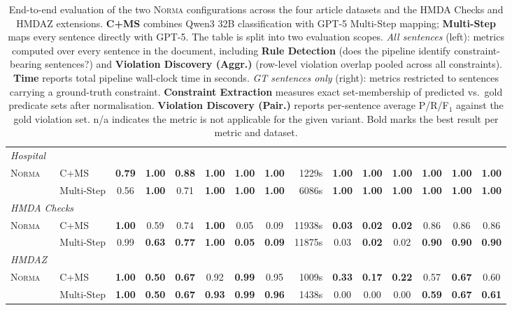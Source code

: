 \begin{table}[t]
\begin{tabular}{llcccccc@{\hspace{0.8em}}r@{\hspace{1.2em}}cccccc}
    \midrule
    \multicolumn{15}{l}{\textit{Hospital}} \\
    \multirow{2}{*}{\textsc{Norma}} & ~~C+MS & \textbf{0.79} & \textbf{1.00} & \textbf{0.88} & \textbf{1.00} & \textbf{1.00} & \textbf{1.00} & 1229s & \textbf{1.00} & \textbf{1.00} & \textbf{1.00} & \textbf{1.00} & \textbf{1.00} & \textbf{1.00} \\
     & ~~Multi-Step & 0.56 & \textbf{1.00} & 0.71 & \textbf{1.00} & \textbf{1.00} & \textbf{1.00} & 6086s & \textbf{1.00} & \textbf{1.00} & \textbf{1.00} & \textbf{1.00} & \textbf{1.00} & \textbf{1.00} \\
    \midrule
    \multicolumn{15}{l}{\textit{HMDA Checks}} \\
    \multirow{2}{*}{\textsc{Norma}} & ~~C+MS & \textbf{1.00} & 0.59 & 0.74 & \textbf{1.00} & 0.05 & 0.09 & 11938s & \textbf{0.03} & \textbf{0.02} & \textbf{0.02} & 0.86 & 0.86 & 0.86 \\
     & ~~Multi-Step & 0.99 & \textbf{0.63} & \textbf{0.77} & \textbf{1.00} & \textbf{0.05} & \textbf{0.09} & 11875s & 0.03 & \textbf{0.02} & 0.02 & \textbf{0.90} & \textbf{0.90} & \textbf{0.90} \\
    \midrule
    \multicolumn{15}{l}{\textit{HMDAZ}} \\
    \multirow{2}{*}{\textsc{Norma}} & ~~C+MS & \textbf{1.00} & \textbf{0.50} & \textbf{0.67} & 0.92 & \textbf{0.99} & 0.95 & 1009s & \textbf{0.33} & \textbf{0.17} & \textbf{0.22} & 0.57 & \textbf{0.67} & 0.60 \\
     & ~~Multi-Step & \textbf{1.00} & \textbf{0.50} & \textbf{0.67} & \textbf{0.93} & \textbf{0.99} & \textbf{0.96} & 1438s & 0.00 & 0.00 & 0.00 & \textbf{0.59} & \textbf{0.67} & \textbf{0.61} \\
    \bottomrule
  \end{tabular}
  \caption{%
    End-to-end evaluation of the two \textsc{Norma} configurations across the four article
    datasets and the HMDA Checks and HMDAZ extensions.
    \textbf{C+MS} combines Qwen3 32B classification with GPT-5 Multi-Step mapping;
    \textbf{Multi-Step} maps every sentence directly with GPT-5.
    The table is split into two evaluation scopes.
    \textit{All sentences} (left): metrics computed over every sentence in the document,
    including \textbf{Rule Detection} (does the pipeline identify constraint-bearing sentences?)
    and \textbf{Violation Discovery (Aggr.)} (row-level violation overlap pooled across all
    constraints). \textbf{Time} reports total pipeline wall-clock time in seconds.
    \textit{GT sentences only} (right): metrics restricted to sentences carrying a
    ground-truth constraint.
    \textbf{Constraint Extraction} measures exact set-membership of predicted vs.\ gold
    predicate sets after normalisation.
    \textbf{Violation Discovery (Pair.)} reports per-sentence average P/R/F$_1$ against
    the gold violation set.
    n/a indicates the metric is not applicable for the given variant.
    Bold marks the best result per metric and dataset.%
  }
  \label{tab:main_results}
\end{table}